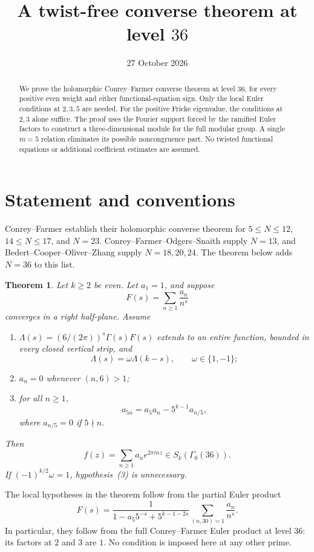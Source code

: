 \documentclass[11pt]{article}
\title{A twist-free converse theorem at level $36$}
\author{}
\date{27 October 2026}
\newtheorem{theorem}{Theorem}
\theoremstyle{remark}
\begin{document}
\maketitle
\begin{abstract}
We prove the holomorphic Conrey--Farmer converse theorem at level $36$,
for every positive even weight and either functional-equation sign.
Only the local Euler conditions at $2,3,5$ are needed.  For the positive
Fricke eigenvalue, the conditions at $2,3$ alone suffice.  The proof uses
the Fourier support forced by the ramified Euler factors to construct a
three-dimensional module for the full modular group.  A single $m=5$
relation eliminates its possible noncongruence part.  No twisted
functional equations or additional coefficient estimates are assumed.
\end{abstract}

\section{Statement and conventions}

Conrey--Farmer \cite{CF} establish their holomorphic converse theorem for
$5\le N\le12$, $14\le N\le17$, and $N=23$.  Conrey--Farmer--Odgers--Snaith
\cite{CFOS} supply $N=13$, and Bedert--Cooper--Oliver--Zhang
\cite{BCOZ} supply $N=18,20,24$.  The theorem below adds $N=36$ to this
list.

\begin{theorem}\label{thm:main}
Let $k\ge2$ be even.  Let $a_1=1$, and suppose
\[
 F(s)=\sum_{n\ge1}\frac{a_n}{n^s}
\]
converges in a right half-plane.  Assume
\begin{enumerate}
\item $\Lambda(s)=(6/(2\pi))^s\Gamma(s)F(s)$ extends to an entire function,
bounded in every closed vertical strip, and
\[
 \Lambda(s)=\omega\Lambda(k-s),\qquad \omega\in\{1,-1\};
\]
\item $a_n=0$ whenever $(n,6)>1$;
\item for all $n\ge1$,
\[
 a_{5n}=a_5a_n-5^{k-1}a_{n/5},
\]
where $a_{n/5}=0$ if $5\nmid n$.
\end{enumerate}
Then
\[
 f(z)=\sum_{n\ge1}a_n e^{2\pi inz}\in S_k(\Gamma_0(36)).
\]
If $(-1)^{k/2}\omega=1$, hypothesis~(3) is unnecessary.
\end{theorem}

The local hypotheses in the theorem follow from the partial Euler product
\[
 F(s)=\frac{1}{1-a_5 5^{-s}+5^{k-1-2s}}
       \sum_{(n,30)=1}\frac{a_n}{n^s}.
\]
In particular, they follow from the full Conrey--Farmer Euler product at
level $36$: its factors at $2$ and $3$ are $1$.  No condition is imposed
here at any other prime.
\end{document}
